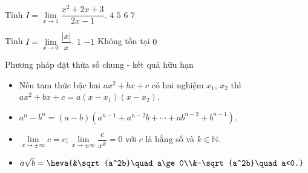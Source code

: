 \begin{ex}%
	Tính $I=\lim\limits_{x \to 1} \dfrac{x^2+2 x+3}{2 x-1}$.	
	\choice
	{ $4$}
	{$5$}
	{\True $6$}
	{$7$}
\end{ex}
\begin{ex}%
	Tính  $I=\lim\limits_{x \to 0} \dfrac{\left|x\right|}{x}$. 
	\choice
	{$1$}
	{$-1$}
	{\True Không tồn tại }
	{$0$}
\end{ex}
\begin{dang}{Phương pháp đặt thừa số chung - kết quả hữu hạn}
	\begin{itemize}
		\item Nếu tam thức bậc hai $ax^2+bx+c$ có hai nghiệm $x_1$, $x_2$ thì $ ax^2+bx+c=a(x-x_1)(x-x_2)$.
		\item $a^n-b^n=(a-b)\left(a^{n-1}+a^{n-2}b+\cdots +ab^{n-2}+b^{n-1}\right)$.
		\item $\lim\limits_{x\to \pm \infty } c=c;\lim\limits_{x\to \pm \infty } \dfrac {c}{x^k}=0$ với $c$ là hằng số và $ k\in \mathbb{N}$.
		\item $a\sqrt{b}=\heva{&\sqrt{a^2b}\quad a\ge 0\\&-\sqrt{a^2b}\quad a<0.}$
	\end{itemize}
\end{dang}
